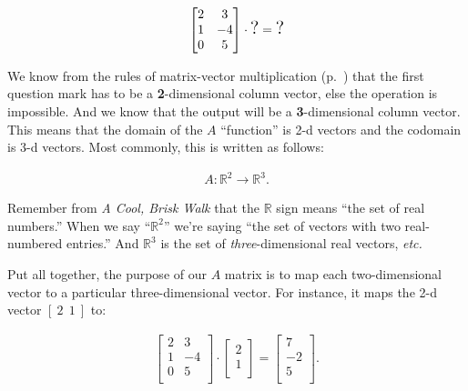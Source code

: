 \vspace{-.15in}
\begin{align*}
\begin{bmatrix}
2 & 3 \\
1 & -4 \\
0 & 5 \\
\end{bmatrix} \cdot \textrm{\Large ?} = \textrm{\Large ?}
\end{align*}
\vspace{-.15in}

We know from the rules of matrix-vector multiplication
(p.~\pageref{matVecRules}) that the first question mark has to be a
\textbf{2}-dimensional column vector, else the operation is impossible. And we
know that the output will be a \textbf{3}-dimensional column vector. This means
that the domain of the $A$ ``function'' is 2-d vectors and the codomain is 3-d
vectors. Most commonly, this is written as follows:

\vspace{-.15in}
\begin{align*}
A : \mathbb{R}^2 \rightarrow \mathbb{R}^3.
\end{align*}
\vspace{-.15in}

Remember from \textit{A Cool, Brisk Walk} that the $\mathbb{R}$ sign means
``the set of real numbers.'' When we say ``$\mathbb{R}^2$'' we're saying ``the
set of vectors with two real-numbered entries.'' And $\mathbb{R}^3$ is the set
of \textit{three}-dimensional real vectors, \textit{etc.}

Put all together, the purpose of our $A$ matrix is to map each two-dimensional
vector to a particular three-dimensional vector. For instance, it maps the 2-d
vector $[\ 2 \ \ 1\ ]$ to:

\vspace{-.15in}
\begin{align*}
\begin{bmatrix}
2 & 3 \\
1 & -4 \\
0 & 5 \\
\end{bmatrix} \cdot 
\begin{bmatrix}
2 \\ 1 \\
\end{bmatrix} =
\begin{bmatrix}
7 \\ -2 \\ 5 \\
\end{bmatrix}.
\end{align*}
\vspace{-.15in}

